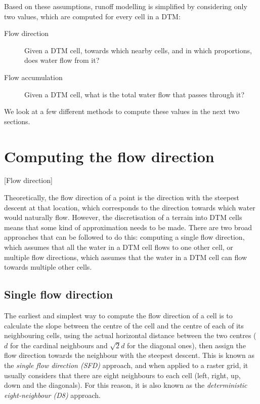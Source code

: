 Based on these assumptions, runoff modelling is simplified by considering only two values, which are computed for every cell in a DTM\@:

\begin{description}
\item[Flow direction]
Given a DTM cell, towards which nearby cells, and in which proportions, does water flow from it?
\item[Flow accumulation]
Given a DTM cell, what is the total water flow that passes through it?
\end{description}

We look at a few different methods to compute these values in the next two sections.

\section{Computing the flow direction}[Flow direction]%
\label{se:direction}

Theoretically, the flow direction of a point is the direction with the steepest descent at that location, which corresponds to the direction towards which water would naturally flow.
However, the discretisation of a terrain into DTM cells means that some kind of approximation needs to be made.
There are two broad approaches that can be followed to do this: computing a single flow direction, which assumes that all the water in a DTM cell flows to one other cell, or multiple flow directions, which assumes that the water in a DTM cell can flow towards multiple other cells.

\subsection{Single flow direction}


The earliest and simplest way to compute the flow direction of a cell is to calculate the slope between the centre of the cell and the centre of each of its neighbouring cells, using the actual horizontal distance between the two centres (\(d\) for the cardinal neighbours and \(\sqrt{2}d\) for the diagonal ones), then assign the flow direction towards the neighbour with the steepest descent.
This is known as the \emph{single flow direction (SFD)} approach,
and when applied to a raster grid, it usually considers that there are eight neighbours to each cell (left, right, up, down and the diagonals).
For this reason, it is also known as the \emph{deterministic eight-neighbour (D8)} approach.

